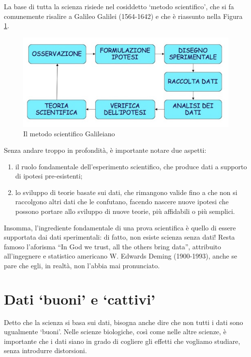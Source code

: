 \documentclass[a4paper,12pt,oneside]{book}
\providecommand{\tightlist}{%
  \setlength{\itemsep}{0pt}\setlength{\parskip}{0pt}}
\begin{document}
La base di tutta la scienza risiede nel cosiddetto `metodo scientifico', che si fa comunemente risalire a Galileo Galilei (1564-1642) e che è riassunto nella Figura \ref{fig:figName11}.

\begin{figure}

{\centering \includegraphics[width=0.75\linewidth]{_images/MSAMap} 

}

\caption{Il metodo scientifico Galileiano}\label{fig:figName11}
\end{figure}

Senza andare troppo in profondità, è importante notare due aspetti:

\begin{enumerate}
\def\labelenumi{\arabic{enumi}.}
\tightlist
\item
  il ruolo fondamentale dell'esperimento scientifico, che produce dati a supporto di ipotesi pre-esistenti;
\item
  lo sviluppo di teorie basate sui dati, che rimangono valide fino a che non si raccolgono altri dati che le confutano, facendo nascere nuove ipotesi che possono portare allo sviluppo di nuove teorie, più affidabili o più semplici.
\end{enumerate}

Insomma, l'ingrediente fondamentale di una prova scientifica è quello di essere supportata dai dati sperimentali: di fatto, non esiste scienza senza dati! Resta famoso l'aforisma ``In God we trust, all the others bring data'', attribuito all'ingegnere e statistico americano W. Edwards Deming (1900-1993), anche se pare che egli, in realtà, non l'abbia mai pronunciato.

\hypertarget{dati-buoni-e-cattivi}{%
\section{Dati `buoni' e `cattivi'}\label{dati-buoni-e-cattivi}}

Detto che la scienza si basa sui dati, bisogna anche dire che non tutti i dati sono ugualmente `buoni'. Nelle scienze biologiche, così come nelle altre scienze, è importante che i dati siano in grado di cogliere gli effetti che vogliamo studiare, senza introdurre distorsioni.
\end{document}
